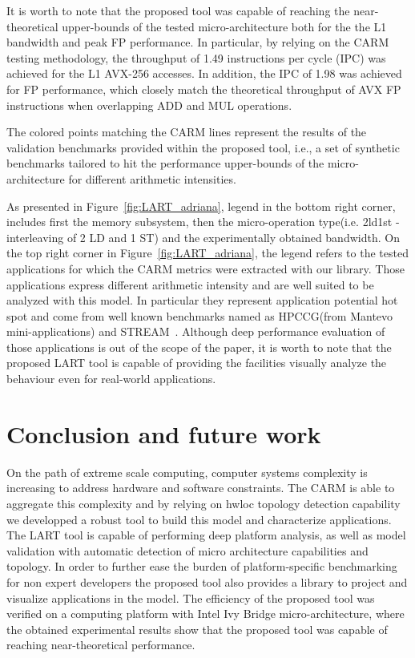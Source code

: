 \documentclass[twoside,twocolumn,8pt]{extarticle}
\begin{document}
It is worth to note that the proposed tool was capable of reaching the near-theoretical upper-bounds of the tested
micro-architecture both for the the L1 bandwidth and peak FP performance.  In particular, by relying on the CARM testing
methodology,  the throughput of 1.49 instructions per cycle (IPC) was achieved for the  L1 AVX-256 accesses. In addition, the
IPC of 1.98 was achieved for FP performance, which closely match the theoretical throughput of AVX FP instructions when overlapping
ADD and MUL operations.

The colored points matching the CARM lines represent the results of the validation benchmarks provided within the proposed tool,
i.e., a set of synthetic benchmarks tailored to hit the performance upper-bounds of the micro-architecture for different
arithmetic intensities.

As presented in Figure~\ref{fig:LART_adriana}, legend in the bottom right corner, includes first the memory subsystem,
then the micro-operation type(i.e. 2ld1st - interleaving of 2 LD and 1 ST) and the experimentally obtained bandwidth.
On the top right corner in Figure~\ref{fig:LART_adriana}, the legend refers to the tested applications for which the CARM metrics
were extracted with our library. Those applications express different arithmetic intensity and are well suited to be analyzed with
this model. In particular they represent application potential hot spot and come from well
known benchmarks named as HPCCG(from Mantevo~\cite{barrett2015assessing} mini-applications) and STREAM~\cite{mccalpin1995stream}.
Although deep performance evaluation of those applications is out of the scope of the
paper, it is worth to note that the proposed LART tool is capable of providing the facilities visually analyze the behaviour even
for real-world applications.

\section{Conclusion and future work}\label{sec:conclusion}

On the path of extreme scale computing, computer systems complexity is increasing to address hardware and software constraints.
The CARM is able to aggregate this complexity and by relying on hwloc topology detection capability we developped a robust tool to
build this model and characterize applications. The LART tool is capable of performing deep platform analysis,
as well as model validation with automatic detection of micro architecture capabilities and topology.
In order to further ease the burden of platform-specific benchmarking for non expert developers the proposed tool also provides a
library to project and visualize applications in the model.
The efficiency of the proposed tool was verified on a computing platform with Intel Ivy Bridge micro-architecture, where the
obtained experimental results show that the proposed tool was capable of reaching near-theoretical performance.
\end{document}
